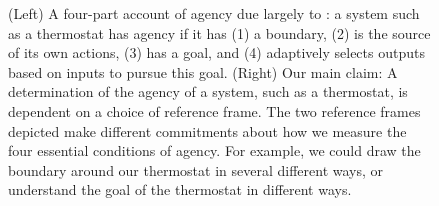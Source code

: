 \documentclass[11pt]{article} %
\begin{document}
%
\begin{figure}[b!]
    \centering
    
     \hspace{8mm}
    
    \caption{(Left) A four-part account of agency due largely to \cite{barandiaran2009defining}: a system such as a thermostat has agency if it has (1) a boundary, (2) is the source of its own actions, (3) has a goal, and (4) adaptively selects outputs based on inputs to pursue this goal. (Right) Our main claim: A determination of the agency of a system, such as a thermostat, is dependent on a choice of reference frame. The two reference frames depicted make different commitments about how we measure the four essential conditions of agency. For example, we could draw the boundary around our thermostat in several different ways, or understand the goal of the thermostat in different ways.} %
    
    \label{fig:frame_dependence}
\end{figure}


%
\end{document}
